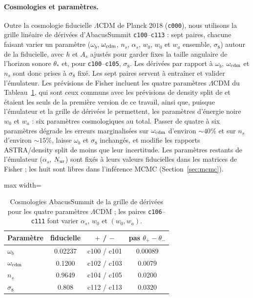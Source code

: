 \paragraph{Cosmologies et paramètres.} Outre la cosmologie fiducielle $\Lambda$CDM de Planck 2018 (\texttt{c000}), nous utilisons la grille linéaire de dérivées d'AbacusSummit \texttt{c100}--\texttt{c113} : sept paires, chacune faisant varier un paramètre ($\omega_b$, $\omega_{\rm cdm}$, $n_s$, $\alpha_s$, $w_0$, $w_0$ et $w_a$ ensemble, $\sigma_8$) autour de la fiducielle, avec $h$ et $A_s$ ajustés pour garder fixes la taille angulaire de l'horizon sonore $\theta_*$ et, pour \texttt{c100}--\texttt{c105}, $\sigma_8$. Les dérivées par rapport à $\omega_b$, $\omega_{\rm cdm}$ et $n_s$ sont donc prises à $\sigma_8$ fixé. Les sept paires servent à entraîner et valider l'émulateur. Les prévisions de Fisher incluent les quatre paramètres $\Lambda$CDM du Tableau~\ref{tab:cosmo}, qui sont ceux communs avec les prévisions de density split de \cite{Paillas2023} et étaient les seuls de la première version de ce travail, ainsi que, puisque l'émulateur et la grille de dérivées le permettent, les paramètres d'énergie noire $w_0$ et $w_a$ : six paramètres cosmologiques au total. Passer de quatre à six paramètres dégrade les erreurs marginalisées sur $\omega_{\rm cdm}$ d'environ $\sim40\%$ et sur $n_s$ d'environ $\sim15\%$, laisse $\omega_b$ et $\sigma_8$ inchangés, et modifie les rapports ASTRA/density split de moins que leur incertitude. Les paramètres restants de l'émulateur ($\alpha_s$, $N_{\rm ur}$) sont fixés à leurs valeurs fiducielles dans les matrices de Fisher ; les huit sont libres dans l'inférence MCMC (Section~\ref{sec:mcmc}).

\begin{table}[!htbp]
\centering\small
\begin{adjustbox}{max width=\linewidth}
\begin{tabular}{lccc}
\toprule
Paramètre & fiducielle & $+$ / $-$ & pas $\theta_+-\theta_-$ \\
\midrule
$\omega_b$ & 0.02237 & c100 / c101 & 0.00089 \\
$\omega_{\rm cdm}$ & 0.1200 & c102 / c103 & 0.0079 \\
$n_s$ & 0.9649 & c104 / c105 & 0.0200 \\
$\sigma_8$ & 0.808 & c112 / c113 & 0.0320 \\
\bottomrule
\end{tabular}
\end{adjustbox}
\caption{Cosmologies AbacusSummit de la grille de dérivées pour les quatre paramètres $\Lambda$CDM ; les paires \texttt{c106}--\texttt{c111} font varier $\alpha_s$, $w_0$ et $(w_0, w_a)$.}
\label{tab:cosmo}
\end{table}

